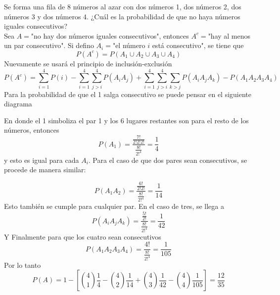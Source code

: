 \item Se forma una fila de 8 números al azar con dos números 1, dos números 2, dos números 3 y dos números 4. ¿Cuál es la probabilidad de que no haya números iguales consecutivos?\e\\
    Sea $A=$"no hay dos números iguales consecutivos", entonces $A^c=$"hay al menos un par consecutivo". Si defino $A_i=$"el número $i$ está consecutivo", se tiene que\[P(A^c)=P(A_1\cup A_2\cup A_3\cup A_4)\]
    Nuevamente se usará el principio de inclusión-exclusión\[P(A^c)=\sum\limits_{i=1}^4P(i)-\sum\limits_{i=1}^4\sum\limits_{j>i}^4P(A_iA_j)+\sum\limits_{i=1}^4\sum\limits_{j>i}^4\sum\limits_{k>j}P(A_iA_jA_k)-P(A_1A_2A_3A_4)\]
    Para la probabilidad de que el 1 salga consecutivo se puede pensar en el siguiente diagrama
    \begin{center}
    \end{center}
    En donde el 1 simboliza el par 1 y los 6 lugares restantes son para el resto de los números, entonces\[P(A_1)=\frac{\frac{7!}{2!2!2!}}{\frac{8!}{{2!}^4}}=\frac{1}{4}\]
    y esto es igual para cada $A_i$. Para el caso de que dos pares sean consecutivos, se procede de manera similar:
    \begin{center}
    \end{center}
    \[P(A_1A_2)=\frac{\frac{6!}{2!2!}}{\frac{8!}{2!^4}}=\frac{1}{14}\]
    Esto también se cumple para cualquier par. En el caso de tres, se llega a\[P(A_iA_jA_k)=\frac{\frac{5!}{2!}}{\frac{8!}{2!^4}}=\frac{1}{42}\]
    Y Finalmente para que los cuatro sean consecutivos\[P(A_1A_2A_3A_4)=\frac{4!}{\frac{8!}{2!^4}}=\frac{1}{105}\]
    Por lo tanto\[P(A)=1-\left[\binom{4}{1}\frac{1}{4}-\binom{4}{2}\frac{1}{14}+\binom{4}{3}\frac{1}{42}-\binom{4}{4}\frac{1}{105}\right]=\frac{12}{35}\]